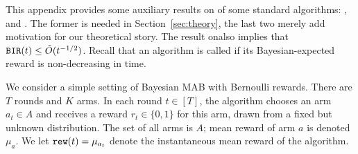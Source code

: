 

\newcommand{\ExplorExploit}{\term{ExplorExploit}}
\newcommand{\PhasedExplorExploit}{\term{PhasedExplorExploit}}
\newcommand{\SuccesiveEliminationReset}{\term{SuccesiveEliminationReset}}

\newcommand{\IReg}{R^{\term{inst}}} %




This appendix provides some auxiliary results on \bmonotonicity of some standard algorithms: \DynGreedy, \DynamicEpsGreedy and \Thompson. The former is needed in Section~\ref{sec:theory}, the last two merely add motivation for our theoretical story. The result on\Thompson also implies that $\mathtt{BIR}(t)\leq \tilde{O}(t^{-1/2})$. Recall that an algorithm is called \bmonotone if its Bayesian-expected reward is non-decreasing in time.

We consider a simple setting of Bayesian MAB with Bernoulli rewards. There are $T$ rounds and $K$ arms. In each round $t\in [T]$, the algorithm chooses an arm $a_t\in A$ and receives a reward $r_t\in\{0,1\}$ for this arm, drawn from a fixed but unknown distribution. The set of all arms is $A$; mean reward of arm $a$ is denoted $\mu_a$. 
We let
    $\mathtt{rew}(t) = \mu_{a_t}$
denote the instantaneous mean reward of the algorithm.


